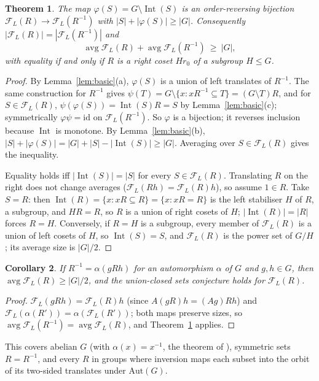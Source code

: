 \documentclass[11pt]{amsart}
\newtheorem{theorem}{Theorem}
\newtheorem{corollary}[theorem]{Corollary}
\theoremstyle{remark}
\newcommand{\Int}{\operatorname{Int}}
\newcommand{\avg}{\operatorname{avg}}
\begin{document}
\begin{theorem}\label{thm:recip}
The map $\varphi(S)=G\setminus\Int(S)$ is an order-reversing bijection $\mathcal F_L(R)\to\mathcal F_L(R^{-1})$ with
$|S|+|\varphi(S)|\ge|G|$. Consequently $|\mathcal F_L(R)|=|\mathcal F_L(R^{-1})|$ and
\[\avg\mathcal F_L(R)+\avg\mathcal F_L(R^{-1})\ \ge\ |G|,\]
with equality if and only if $R$ is a right coset $Hr_0$ of a subgroup $H\le G$.
\end{theorem}
\begin{proof}
By Lemma~\ref{lem:basic}(a), $\varphi(S)$ is a union of left translates of $R^{-1}$. The same construction for $R^{-1}$ gives
$\psi(T)=G\setminus\{x:xR^{-1}\subseteq T\}=(G\setminus T)R$, and for $S\in\mathcal F_L(R)$,
$\psi(\varphi(S))=\Int(S)R=S$ by Lemma~\ref{lem:basic}(c); symmetrically $\varphi\psi=\mathrm{id}$ on $\mathcal F_L(R^{-1})$. So
$\varphi$ is a bijection; it reverses inclusion because $\Int$ is monotone. By Lemma~\ref{lem:basic}(b),
$|S|+|\varphi(S)|=|G|+|S|-|\Int(S)|\ge|G|$. Averaging over $S\in\mathcal F_L(R)$ gives the inequality.

Equality holds iff $|\Int(S)|=|S|$ for every $S\in\mathcal F_L(R)$. Translating $R$ on the right does not change averages
($\mathcal F_L(Rh)=\mathcal F_L(R)h$), so assume $1\in R$. Take $S=R$: then $\Int(R)=\{x: xR\subseteq R\}=\{x:xR=R\}$ is the left
stabiliser $H$ of $R$, a subgroup, and $HR=R$, so $R$ is a union of right cosets of $H$; $|\Int(R)|=|R|$ forces $R=H$. Conversely, if
$R=H$ is a subgroup, every member of $\mathcal F_L(R)$ is a union of left cosets of $H$, so $\Int(S)=S$, and $\mathcal F_L(R)$ is
the power set of $G/H$; its average size is $|G|/2$.
\end{proof}

\begin{corollary}\label{cor:selfdual}
If $R^{-1}=\alpha(gRh)$ for an automorphism $\alpha$ of $G$ and $g,h\in G$, then $\avg\mathcal F_L(R)\ge|G|/2$, and the union-closed
sets conjecture holds for $\mathcal F_L(R)$.
\end{corollary}
\begin{proof}
$\mathcal F_L(gRh)=\mathcal F_L(R)h$ (since $A(gR)h=(Ag)Rh$) and $\mathcal F_L(\alpha(R'))=\alpha(\mathcal F_L(R'))$; both maps
preserve sizes, so $\avg\mathcal F_L(R^{-1})=\avg\mathcal F_L(R)$, and Theorem~\ref{thm:recip} applies.
\end{proof}
This covers abelian $G$ (with $\alpha(x)=x^{-1}$, the theorem of \cite{AEL}), symmetric sets $R=R^{-1}$, and every $R$ in groups where
inversion maps each subset into the orbit of its two-sided translates under $\mathrm{Aut}(G)$.
\end{document}
